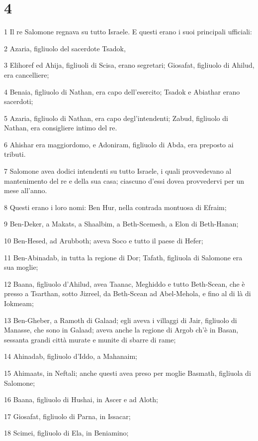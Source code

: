\chapter{4}

\par 1 Il re Salomone regnava su tutto Israele. E questi erano i suoi principali ufficiali:
\par 2 Azaria, figliuolo del sacerdote Tsadok,
\par 3 Elihoref ed Ahija, figliuoli di Scisa, erano segretari; Giosafat, figliuolo di Ahilud, era cancelliere;
\par 4 Benaia, figliuolo di Nathan, era capo dell'esercito; Tsadok e Abiathar erano sacerdoti;
\par 5 Azaria, figliuolo di Nathan, era capo degl'intendenti; Zabud, figliuolo di Nathan, era consigliere intimo del re.
\par 6 Ahishar era maggiordomo, e Adoniram, figliuolo di Abda, era preposto ai tributi.
\par 7 Salomone avea dodici intendenti su tutto Israele, i quali provvedevano al mantenimento del re e della sua casa; ciascuno d'essi dovea provvedervi per un mese all'anno.
\par 8 Questi erano i loro nomi: Ben Hur, nella contrada montuosa di Efraim;
\par 9 Ben-Deker, a Makats, a Shaalbim, a Beth-Scemesh, a Elon di Beth-Hanan;
\par 10 Ben-Hesed, ad Arubboth; aveva Soco e tutto il paese di Hefer;
\par 11 Ben-Abinadab, in tutta la regione di Dor; Tafath, figliuola di Salomone era sua moglie;
\par 12 Baana, figliuolo d'Ahilud, avea Taanac, Meghiddo e tutto Beth-Scean, che è presso a Tsarthan, sotto Jizreel, da Beth-Scean ad Abel-Mehola, e fino al di là di Iokmeam;
\par 13 Ben-Gheber, a Ramoth di Galaad; egli aveva i villaggi di Jair, figliuolo di Manasse, che sono in Galaad; aveva anche la regione di Argob ch'è in Basan, sessanta grandi città murate e munite di sbarre di rame;
\par 14 Ahinadab, figliuolo d'Iddo, a Mahanaim;
\par 15 Ahimaats, in Neftali; anche questi avea preso per moglie Basmath, figliuola di Salomone;
\par 16 Baana, figliuolo di Hushai, in Ascer e ad Aloth;
\par 17 Giosafat, figliuolo di Parna, in Issacar;
\par 18 Scimei, figliuolo di Ela, in Beniamino;
